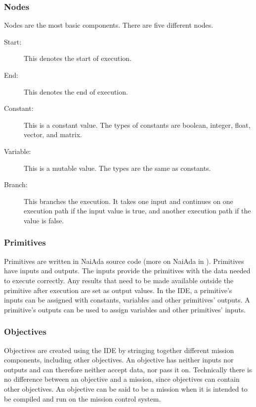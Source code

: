 \subsubsection{Nodes}
Nodes are the most basic components. There are five different nodes.
\begin{description}
\item[Start:] This denotes the start of execution.
\item[End:] This denotes the end of execution.
\item[Constant:] This is a constant value. The types of constants are boolean, integer, float, vector, and matrix.
\item[Variable:] This is a mutable value. The types are the same as constants.
\item[Branch:] This branches the execution. It takes one input and continues on one execution path if the input value is true, and another execution path if the value is false.
\end{description}

\subsubsection{Primitives}
\label{sec:primitives}
Primitives are written in NaiAda source code (more on NaiAda in ). Primitives have inputs and outputs. The inputs provide the primitives with the data needed to execute correctly. Any results that need to be made available outside the primitive after execution are set as output values. In the IDE, a primitive's inputs can be assigned with constants, variables and other primitives' outputs. A primitive's outputs can be
used to assign variables and other primitives' inputs.

\subsubsection{Objectives}
Objectives are created using the IDE by stringing together different mission components, including other objectives. An objective has neither inputs nor outputs and can therefore neither accept data, nor pass it on. Technically there is no difference between an objective and a mission, since objectives can contain other objectives. An objective can be said to be a mission when it is intended to be compiled and run on the mission control system.
